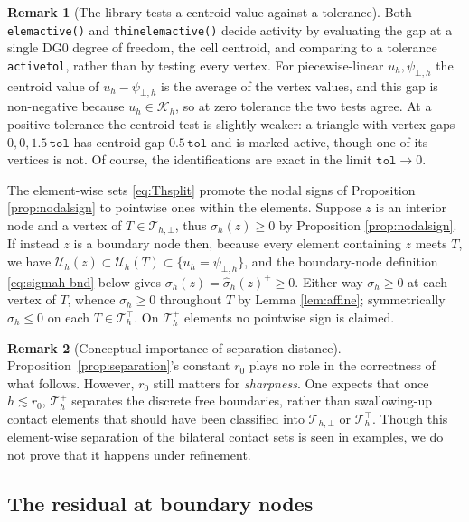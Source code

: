 \documentclass[12pt]{amsart}
\theoremstyle{definition}
\newtheorem{remark}{Remark}
\newcommand{\psiloh}{\psi_{\bot,h}}
\newcommand{\Th}{\mathcal{T}_h}
\newcommand{\Uh}{\mathcal{U}_h}
\newcommand{\Kh}{\mathcal{K}_h}
\newcommand{\Thbot}{\mathcal{T}_{h,\bot}}
\newcommand{\Thtop}{\Th^\top}
\newcommand{\Thplus}{\Th^+}
\begin{document}
\begin{remark}[The library tests a centroid value against a tolerance]
\label{rem:activetol}
Both \texttt{elemactive()} and \texttt{thinelemactive()} decide activity by evaluating the gap at a single DG0 degree of freedom, the cell centroid, and comparing to a tolerance \texttt{activetol}, rather than by testing every vertex.  For piecewise-linear $u_h,\psiloh$ the centroid value of $u_h - \psiloh$ is the average of the vertex values, and this gap is non-negative because $u_h \in \Kh$, so at zero tolerance the two tests agree.  At a positive tolerance the centroid test is slightly weaker: a triangle with vertex gaps $0,0,1.5\,\texttt{tol}$ has centroid gap $0.5\,\texttt{tol}$ and is marked active, though one of its vertices is not.  Of course, the identifications are exact in the limit $\texttt{tol}\to 0$.
\end{remark}

The element-wise sets \eqref{eq:Thsplit} promote the nodal signs of Proposition \ref{prop:nodalsign} to pointwise ones within the elements.  Suppose $z$ is an interior node and a vertex of $T \in \Thbot$, thus $\sigma_h(z) \ge 0$ by Proposition \ref{prop:nodalsign}.  If instead $z$ is a boundary node then, because every element containing $z$ meets $T$, we have $\Uh(z) \subset \Uh(T) \subset \{u_h = \psiloh\}$, and the boundary-node definition \eqref{eq:sigmah-bnd} below gives $\sigma_h(z) = \hat\sigma_h(z)^+ \ge 0$.  Either way $\sigma_h \ge 0$ at each vertex of $T$, whence $\sigma_h \ge 0$ throughout $T$ by Lemma \ref{lem:affine}; symmetrically $\sigma_h \le 0$ on each $T \in \Thtop$.  On $\Thplus$ elements no pointwise sign is claimed.

\begin{remark}[Conceptual importance of separation distance]
\label{rem:sepconcept}
Proposition~\ref{prop:separation}'s constant $r_0$ plays no role in the correctness of what follows.  However, $r_0$ still matters for \emph{sharpness}.  One expects that once $h \lesssim r_0$, $\Thplus$ separates the discrete free boundaries, rather than swallowing-up contact elements that should have been classified into $\Thbot$ or $\Thtop$.  Though this element-wise separation of the bilateral contact sets is seen in examples, we do not prove that it happens under refinement.
\end{remark}


\subsection{The residual at boundary nodes}
\end{document}
